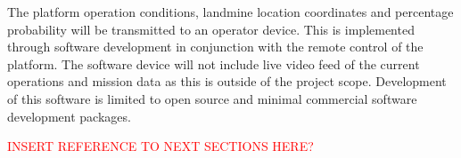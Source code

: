 \documentclass[main.tex]{subfiles}
\begin{document}
The platform operation conditions, landmine location coordinates and percentage probability will be transmitted to an operator device. This is implemented through software development in conjunction with the remote control of the platform. The software device will not include live video feed of the current operations and mission data as this is outside of the project scope. Development of this software is limited to open source and minimal commercial software development packages.

\textcolor{red}{INSERT REFERENCE TO NEXT SECTIONS HERE?}
\end{document}
